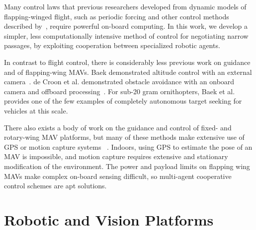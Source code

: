 \documentclass{aamas2013}
\begin{document}
Many control laws that previous researchers developed from
dynamic models of flapping-winged flight, such as periodic forcing and other
control methods described %
by~\cite{doman:dynamics}\cite{khan:longitudinal_control}\cite{leonard:averaging}, 
require powerful on-board computing. In this work, we develop a simpler, less
computationally intensive method of control for negotiating narrow passages, by exploiting cooperation between specialized robotic agents.

In contrast to flight control, there is considerably less previous work on guidance and of flapping-wing MAVs. 
Baek demonstrated altitude control with an external camera~\cite{baek:altitude}. 
de Croon et al. demonstrated obstacle avoidance with an onboard camera and offboard 
processing~\cite{delfly:avoid}. For sub-20 gram ornithopters, Baek et al. 
\cite{baek:tracking} provides one of the few examples of completely autonomous target seeking for vehicles at this scale.

There also exists a body of work on the guidance and control of fixed- and rotary-wing 
MAV platforms, but many of these methods make extensive use of GPS or motion capture systems
~\cite{kingston:timeattitude}\cite{kanade:3dvision}. Indoors, using
GPS to estimate the pose of an MAV is impossible, and motion capture
requires extensive and stationary modification of the environment. The power
and payload limits on flapping wing MAVs make complex on-board sensing difficult, so multi-agent
cooperative control schemes are apt solutions.

\cite{Jung1998Range}\cite{Hyams1999Cooperative}\cite{Mehta2006Adaptive}
\cite{Rudol2008Micro}\cite{Luo2011Air}


\section{Robotic and Vision Platforms}
\end{document}
